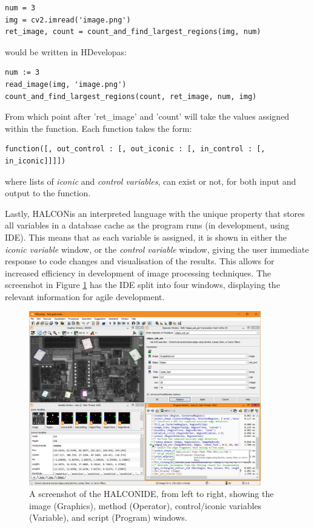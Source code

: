 \documentclass[fleqn,twoside,12pt]{report}
\begin{document}
\begin{lstlisting}
num = 3
img = cv2.imread('image.png')
ret_image, count = count_and_find_largest_regions(img, num)
\end{lstlisting} 

would be written in HDevelop\texttrademark as:

\begin{lstlisting}
num := 3
read_image(img, 'image.png')
count_and_find_largest_regions(count, ret_image, num, img)
\end{lstlisting} 

From which point after 'ret\_image' and 'count' will take the values assigned within the function. Each function takes the form:

\begin{lstlisting}
function([, out_control : [, out_iconic : [, in_control : [, in_iconic]]]])
\end{lstlisting} 

where lists of  \textit{iconic} and  \textit{control variables}, can exist or not, for both input and output to the function.


Lastly, HALCON\texttrademark is an interpreted language with the unique property that stores all variables in a database cache as the program runs (in development, using IDE). This means that as each variable is assigned, it is shown in either the \textit{iconic variable} window, or the \textit{control variable} window, giving the user immediate response to code changes and visualisation of the results. This allows for increased efficiency in development of image processing techniques. The screenshot in Figure \ref{fig:halcon_ide} has the IDE split into four windows, displaying the relevant information for agile development.  


\begin{figure}[h]
	\centering
	\includegraphics[width=0.9\textwidth]{halcon_ide.png}
	\caption{A screenshot of the HALCON\texttrademark IDE, from left to right, showing the image (Graphics), method (Operator), control/iconic variables (Variable), and script (Program) windows.}
	\label{fig:halcon_ide}
\end{figure} 
\end{document}
